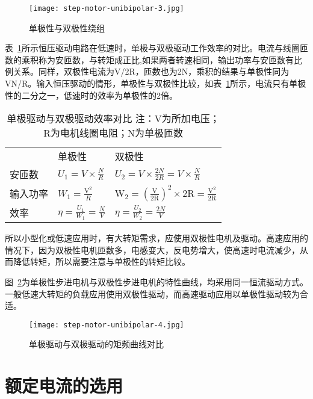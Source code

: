 \begin{figure}[htbp]
    \centering
    \texttt{[image: step-motor-unibipolar-3.jpg]}
    \caption{单极性与双极性绕组}
    \label{fig:step-motor-unibipolar-3}
\end{figure}

表~\ref{tab:step-motor-unibipolar}所示恒压驱动电路在低速时，单极与双极驱动工作效率的对比。电流与线圈匝数的乘积称为安匝数，与转矩成正比,如果两者转速相同，输出功率与安匝数有比例关系。同样，双极性电流为V/2R，匝数也为2N，乘积的结果与单极性同为VN/R。输入恒压驱动的情形，单极性与双极性比较，如表~\ref{tab:step-motor-unibipolar}所示，电流只有单极性的二分之一，低速时的效率为单极性的2倍。

\begin{table}[htbp]
    \centering
    \begin{tabular}{lll}
     & 单极性 & 双极性 \\
    安匝数 & $U_{1}=V \times \frac{N}{R}$ & $U_{2}=V \times \frac{2N}{2R}=V \times \frac{N}{R}$\\
    输入功率 & $W_{1}=\frac{\mathrm{V}^{2}}{R}$ & $\mathrm{W}_{2}=(\frac{\mathrm{V}}{2 \mathrm{R}} )^{2} \times  2 \mathrm{R}=\frac{\mathrm{V}^{2}}{2 \mathrm{R}} $ \\
    效率 & $\eta = \frac{U_{1}}{W_{1}} = \frac{N}{V}$ & $\eta = \frac{U_{2}}{W_{2}} = \frac{2N}{V}$
    \end{tabular}
    \caption{单极驱动与双极驱动效率对比 注：V为所加电压；R为电机线圈电阻；N为单极匝数}
    \label{tab:step-motor-unibipolar}
\end{table}

所以小型化或低速应用时，有大转矩需求，应使用双极性电机及驱动。高速应用的情况下，因为双极性电机匝数多，电感变大，反电势增大，使高速时电流减少，从而降低转矩，所以需要注意与单极性的转矩比较。

图~\ref{fig:step-motor-unibipolar-4}为单极性步进电机与双极性步进电机的特性曲线，均采用同一恒流驱动方式。一般低速大转矩的负载应用使用双极性驱动，而高速驱动应用以单极性驱动较为合适。

\begin{figure}[htbp]
    \centering
    \texttt{[image: step-motor-unibipolar-4.jpg]}
    \caption{单极驱动与双极驱动的矩频曲线对比}
    \label{fig:step-motor-unibipolar-4}
\end{figure}

\section{额定电流的选用}

